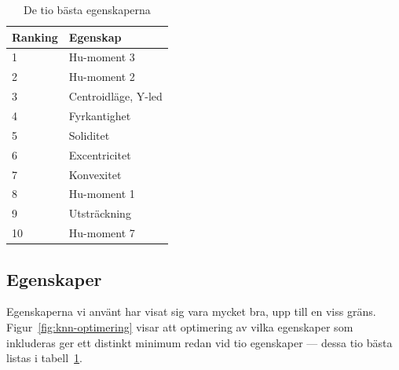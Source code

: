 \documentclass[../rapport_MVEX01-11-05]{subfiles}
\begin{document}
\begin{table}[tb]
	\centering
	\caption{De tio bästa egenskaperna}
	\label{tab:bestfeats}
	\begin{tabular}{ll}
		\toprule
		Ranking & Egenskap \\
		\midrule
		1 & Hu-moment 3 \\
		2 & Hu-moment 2 \\
		3 & Centroidläge, Y-led \\
		4 & Fyrkantighet \\
		5 & Soliditet \\
		6 & Excentricitet \\
		7 & Konvexitet \\
		8 & Hu-moment 1 \\
		9 & Utsträckning \\
		10 & Hu-moment 7 \\
		\bottomrule
	\end{tabular}
\end{table}

\subsection{Egenskaper}\label{sec:resultat_features}

Egenskaperna vi använt har visat sig vara mycket bra, upp till en viss gräns.
Figur~\ref{fig:knn-optimering} visar att optimering av vilka egenskaper som
inkluderas ger ett distinkt minimum redan vid tio egenskaper --- dessa tio
bästa listas i tabell~\ref{tab:bestfeats}.
\end{document}
